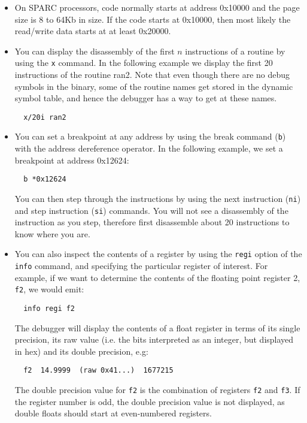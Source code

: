 \begin{itemize}
\item On SPARC processors, code normally starts at address 0x10000 and the 
  page size is 8 to 64Kb in size.  If the code starts at 0x10000, then most
  likely the read/write data starts at at least 0x20000.

\item You can display the disassembly of the first $n$ instructions of a 
  routine by using the \texttt{x} command.  In the following example we 
  display the first 20 instructions of the routine ran2.  Note that even 
  though there are no debug symbols in the binary, some of the routine 
  names get stored in the dynamic symbol table, and hence the debugger has 
  a way to get at these names.  
  \begin{verbatim}
  x/20i ran2
  \end{verbatim}

\item You can set a breakpoint at any address by using the break command 
  (\verb!b!) with the address dereference operator.  In the following 
  example, we set a breakpoint at address 0x12624: 
  \begin{verbatim}
  b *0x12624
  \end{verbatim}

  You can then step through the instructions by using the next instruction 
  (\verb!ni!) and step instruction (\verb!si!) commands. 
  You will not see a disassembly of the instruction as you step, 
  therefore first disassemble about 20 instructions to know where you are. 

\item You can also inspect the contents of a register by using the 
  \verb!regi! option of the \verb!info! command, and specifying the 
  particular register of interest.  For example, if we want to determine
  the contents of the floating point register 2, \verb!f2!, we would emit: 
  \begin{verbatim}
  info regi f2
  \end{verbatim}
  The debugger will display the contents of a float register in terms of 
  its single precision, its raw value (i.e. the bits interpreted as an 
  integer, but displayed in hex) and its double precision, e.g: 
  \begin{verbatim}
  f2  14.9999  (raw 0x41...)  1677215
  \end{verbatim}
  The double precision value for \verb!f2! is the combination of registers
  \verb!f2! and \verb!f3!.  If the register number is odd, the double 
  precision value is not displayed, as double floats should start at 
  even-numbered registers. 
\end{itemize}


